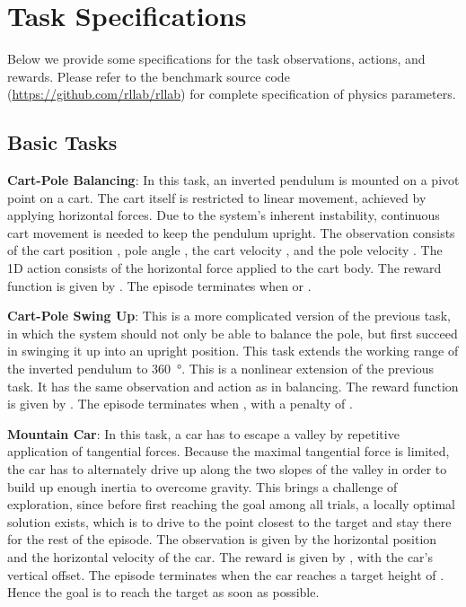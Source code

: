 \documentclass{article}
\begin{document}
\setlength{\bibsep}{4.0pt}
\small



\normalsize
\clearpage{}\renewcommand*{\UrlFont}{\normalsize}

\onecolumn

\setcounter{section}{0}

\section{Task Specifications}

Below we provide some specifications for the task observations, actions, and rewards. Please refer to the benchmark source code (\url{https://github.com/rllab/rllab}) for complete specification of physics parameters.

\subsection{Basic Tasks}

{\bf Cart-Pole Balancing}: In this task, an inverted pendulum is mounted on a pivot point on a cart. The cart itself is restricted to linear movement, achieved by applying horizontal forces. Due to the system's inherent instability, continuous cart movement is needed to keep the pendulum upright. The observation consists of the cart position , pole angle , the cart velocity , and the pole velocity . The 1D action consists of the horizontal force applied to the cart body. The reward function is given by 
. The episode terminates when  or .

{\bf Cart-Pole Swing Up}: This is a more complicated version of the previous task, in which the system should not only be able to balance the pole, but first succeed in swinging it up into an upright position. This task extends the working range of the inverted pendulum to \SI{360}{\degree}. This is a nonlinear extension of the previous task. It has the same observation and action as in balancing. The reward function is given by . The episode terminates when , with a penalty of .

{\bf Mountain Car}: In this task, a car has to escape a valley by repetitive application of tangential forces. Because the maximal tangential force is limited, the car has to alternately drive up along the two slopes of the valley in order to build up enough inertia to overcome gravity. This brings a challenge of exploration, since before first reaching the goal among all trials, a locally optimal solution exists, which is to drive to the point closest to the target and stay there for the rest of the episode. The observation is given by the horizontal position  and the horizontal velocity  of the car. The reward is given by , with  the car's vertical offset. The episode terminates when the car reaches a target height of . Hence the goal is to reach the target as soon as possible.
\end{document}
